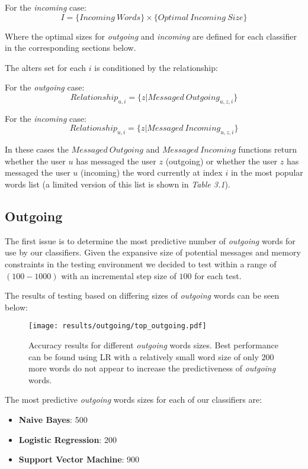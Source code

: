 For the \emph{incoming} case:
\[ I = \{Incoming \ Words\} \times \{Optimal \ Incoming \ Size\} \]

Where the optimal sizes for \emph{outgoing} and \emph{incoming} are defined for each classifier in the corresponding sections below.

The alters set for each $i$ is conditioned by the relationship:

For the \emph{outgoing} case:
\[ Relationship_{u,i} = \{z | Messaged \ Outgoing_{u,z,i}\} \]

For the \emph{incoming} case:
\[ Relationship_{u,i} = \{z | Messaged \ Incoming_{u,z,i}\} \]

In these cases the $Messaged \ Outgoing$ and $Messaged \ Incoming$ functions return whether the user $u$ has messaged the user $z$ (outgoing) 
or whether the user $z$ has messaged the user $u$ (incoming) the word currently at index $i$ in the most popular words list (a limited version of this list is shown in \emph{Table 3.1}).

\subsection{Outgoing}
\label{sec:id}

The first issue is to determine the most predictive number of \emph{outgoing} words for use by our classifiers. 
Given the expansive size of potential messages and memory constraints in the testing environment we decided to test within a range 
of $(100-1000)$ with an incremental step size of $100$ for each test.

The results of testing based on differing sizes of \emph{outgoing} words can be seen below:

\begin{figure}[h]
	\begin{center}
		\texttt{[image: results/outgoing/top\_outgoing.pdf]}
		\caption{Accuracy results for different \emph{outgoing} words sizes. Best performance can be found using LR with a relatively small word size of only $200$ more words do not appear to increase the predictiveness of \emph{outgoing} words.}
	\end{center}
\end{figure}

\clearpage

The most predictive \emph{outgoing} words sizes for each of our classifiers are:
\begin{itemize}
\item \textbf{Naive Bayes}: 500
\item \textbf{Logistic Regression}: 200
\item \textbf{Support Vector Machine}: 900
\end{itemize}

